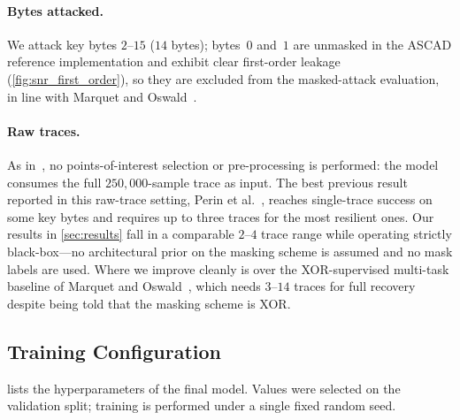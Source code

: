 \documentclass[runningheads]{llncs}
\begin{document}
\paragraph{Bytes attacked.}
We attack key bytes $2$--$15$ ($14$ bytes); bytes~$0$ and~$1$ are unmasked in the ASCAD reference implementation and exhibit clear first-order leakage (\cref{fig:snr_first_order}), so they are excluded from the masked-attack evaluation, in line with Marquet and Oswald~\cite{marquet2024exploring}.

\paragraph{Raw traces.}
As in~\cite{marquet2024exploring}, no points-of-interest selection or pre-processing is performed: the model consumes the full $250{,}000$-sample trace as input.
The best previous result reported in this raw-trace setting, Perin et al.~\cite{perin2022exploring}, reaches single-trace success on some key bytes and requires up to three traces for the most resilient ones.
Our results in \cref{sec:results} fall in a comparable $2$--$4$ trace range while operating strictly black-box---no architectural prior on the masking scheme is assumed and no mask labels are used.
Where we improve cleanly is over the XOR-supervised multi-task baseline of Marquet and Oswald~\cite{marquet2024exploring}, which needs $3$--$14$ traces for full recovery despite being told that the masking scheme is XOR.

\subsection{Training Configuration}

 lists the hyperparameters of the final model.
Values were selected on the validation split; training is performed under a single fixed random seed.
\end{document}
